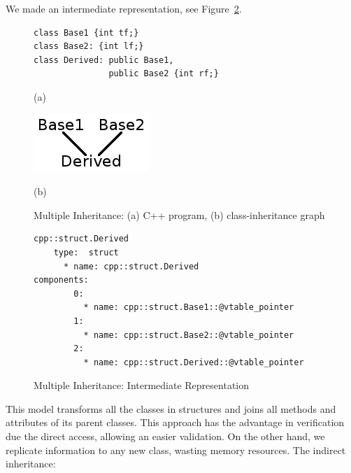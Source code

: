 \documentclass[a4paper]{llncs}
\begin{document}
We made an intermediate representation, see Figure~\ref{figure:multiple-inheritance-IR}.

\begin{figure}[h]

\begin{minipage}[b]{.6\linewidth}
\begin{lstlisting}
class Base1 {int tf;}
class Base2: {int lf;}
class Derived: public Base1, 
               public Base2 {int rf;}
\end{lstlisting}
  \centerline{(a)}\medskip
\end{minipage}
\label{figure:multiple-inheritance-code}
%
\begin{minipage}[b]{.48\linewidth}
  \centering
  \centerline{\includegraphics[scale=0.5]{figures/multiple_inheritance_graph}}
  \centerline{(b)}\medskip
\end{minipage}
%
\caption{Multiple Inheritance: (a) C++ program, (b) class-inheritance graph}
\label{fig:multiple-inheritance-graph}
\end{figure}


\begin{figure}[h]
\centering
\begin{minipage}{0.9\textwidth}
\begin{lstlisting}[style=nonumbers]
cpp::struct.Derived
    type:  struct
      * name: cpp::struct.Derived
components: 
        0: 
          * name: cpp::struct.Base1::@vtable_pointer
        1: 
          * name: cpp::struct.Base2::@vtable_pointer
        2: 
          * name: cpp::struct.Derived::@vtable_pointer
\end{lstlisting}
\end{minipage}
\caption{Multiple Inheritance: Intermediate Representation}
\label{figure:multiple-inheritance-IR}
\end{figure}

This model transforms all the classes in structures and joins all methods and attributes of its parent classes.  This approach has the advantage in verification due the direct access, allowing an easier validation. On the other hand, we replicate information to any new class, wasting memory resources.
The indirect inheritance:
\end{document}
